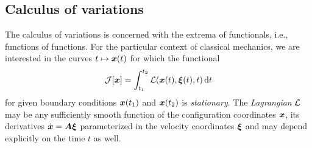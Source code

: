 \subsection{Calculus of variations}\label{sec:CalculusOfVariations}
The calculus of variations is concerned with the extrema of functionals, i.e., functions of functions. %
For the particular context of classical mechanics, we are interested in the curves $t \mapsto \boldsymbol{x}(t)$ for which the functional
\begin{align}\label{eq:Functional}
 \mathcal{J}[\boldsymbol{x}] = \int_{t_1}^{t_2} \mathcal{L}(\boldsymbol{x}(t), \boldsymbol{\xi}(t), t) \, \mathrm{d} t
\end{align}
for given boundary conditions $\boldsymbol{x}(t_1)$ and $\boldsymbol{x}(t_2)$ is \textit{stationary}.
The \textit{Lagrangian} $\mathcal{L}$ may be any sufficiently smooth function of the configuration coordinates $\boldsymbol{x}$, its derivatives $\dot{\boldsymbol{x}} = \boldsymbol{A} \boldsymbol{\xi}$ parameterized in the velocity coordinates $\boldsymbol{\xi}$ and may depend explicitly on the time $t$ as well.

